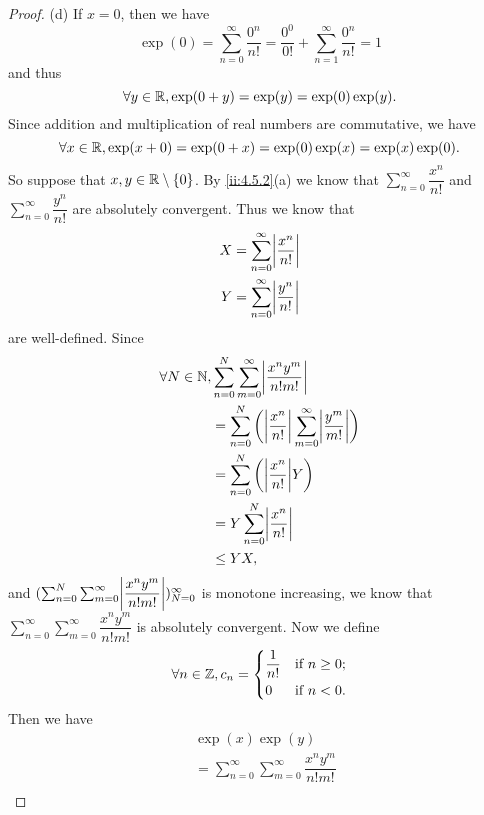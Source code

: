 \begin{proof}{(d)}
  If \(x = 0\), then we have
  \[
    \exp(0) = \sum_{n = 0}^\infty \dfrac{0^n}{n!} = \dfrac{0^0}{0!} + \sum_{n = 1}^\infty \dfrac{0^n}{n!} = 1
  \]
  and thus
  \[
    \forall y \in \mathbb{R}, \exp(0 + y) = \exp(y) = \exp(0) \exp(y).
  \]
  Since addition and multiplication of real numbers are commutative, we have
  \[
    \forall x \in \mathbb{R}, \exp(x + 0) = \exp(0 + x) = \exp(0) \exp(x) = \exp(x) \exp(0).
  \]
  So suppose that \(x, y \in \mathbb{R} \setminus \left\lbrace0\right\rbrace\).
  By \cref{ii:4.5.2}(a) we know that \(\sum_{n = 0}^\infty \dfrac{x^n}{n!}\) and \(\sum_{n = 0}^\infty \dfrac{y^n}{n!}\) are absolutely convergent.
  Thus we know that
  \begin{align*}
    X & = \sum_{n = 0}^\infty \abs{\dfrac{x^n}{n!}} \\
    Y & = \sum_{n = 0}^\infty \abs{\dfrac{y^n}{n!}}
  \end{align*}
  are well-defined.
  Since
  \begin{align*}
    \forall N \in \N, & \sum_{n = 0}^N \sum_{m = 0}^\infty \abs{\dfrac{x^n y^m}{n! m!}}                              \\
                      & = \sum_{n = 0}^N \bigg(\abs{\dfrac{x^n}{n!}} \sum_{m = 0}^\infty \abs{\dfrac{y^m}{m!}}\bigg) \\
                      & = \sum_{n = 0}^N \bigg(\abs{\dfrac{x^n}{n!}} Y\bigg)                                         \\
                      & = Y \sum_{n = 0}^N \abs{\dfrac{x^n}{n!}}                                                     \\
                      & \leq Y X,
  \end{align*}
  and \((\sum_{n = 0}^N \sum_{m = 0}^\infty \abs{\dfrac{x^n y^m}{n! m!}})_{N = 0}^\infty\) is monotone increasing, we know that \(\sum_{n = 0}^\infty \sum_{m = 0}^\infty \dfrac{x^n y^m}{n! m!}\) is absolutely convergent.
  Now we define
  \[
    \forall n \in \mathbb{Z}, c_n = \begin{dcases}
      \dfrac{1}{n!} & \text{if } n \geq 0; \\
      0             & \text{if } n < 0.
    \end{dcases}
  \]
  Then we have
  \begin{align*}
     & \exp(x) \exp(y)                                                                                                                                                           \\
     & = \sum_{n = 0}^\infty \sum_{m = 0}^\infty \dfrac{x^n y^m}{n! m!}                                                                                                          \\

\end{align*}
\end{proof}
